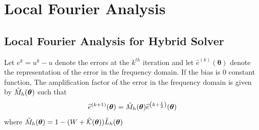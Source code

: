 \documentclass[12pt]{article}
\begin{document}

\printbibliography


\appendix





\section{Local Fourier Analysis}

\subsection{Local Fourier Analysis for Hybrid Solver} \label{sec:lfahybridsolver}

\begin{lemma}
    Let $e^{k} = u^k - u$ denote the errors at the $k^{th}$ iteration and let $\widehat{e}^{(k)}(\boldsymbol{\theta})$ denote the representation of the error in the frequency domain. If the bias is $0$ constant function, The amplification factor of the error in the frequency domain is given by $\Tilde{M}_{h}(\boldsymbol{\theta})$ such that
    $$\widehat{e}^{(k + 1)}(\boldsymbol{\theta}) = \Tilde{M}_{h}(\boldsymbol{\theta})\widehat{e}^{\left(k + \frac{1}{2}\right)}(\boldsymbol{\theta})$$
    where $\Tilde{M}_{h}(\boldsymbol{\theta}) = 1 - (W + \Tilde{\mathcal{K}}(\boldsymbol{\theta}))\Tilde{L}_h(\boldsymbol{\theta})$
\end{lemma}
\end{document}

